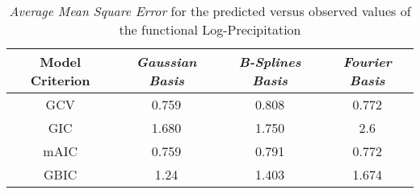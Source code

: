\begin{table}[ht]
\caption[\textit{Average Mean Square Error} for the predicted versus observed values of the the functional  \textit{Log-Precipitation}]{\textit{Average Mean Square Error} for the predicted versus observed values of the functional Log-Precipitation} %
\centering %
\begin{tabular}{c c c c} %
\hline\hline %
Model Criterion & \textit{Gaussian Basis} & \textit{B-Splines Basis} & \textit{Fourier Basis} \\ [0.5ex] %
\hline %
GCV & 0.759 & 0.808 & 0.772 \\ %
GIC & 1.680 & 1.750 & 2.6 \\
mAIC & 0.759 & 0.791 & 0.772 \\
GBIC & 1.24 & 1.403 & 1.674 \\ [1ex] %
\hline %
\end{tabular}
\label{table:amse} %
\end{table}
